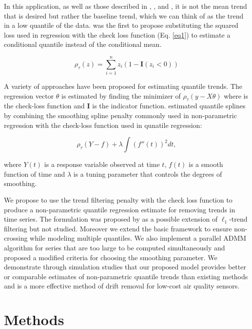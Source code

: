 \documentclass[12pt]{article}
\begin{document}
	
	In this application, as well as those described in \cite{Ning2014}, \cite{marandi2015qualitative}, and \cite{pettersson2013algorithm}, it is not the mean trend that is desired but rather the baseline trend, which we can think of as the trend in a low quantile of the data.  \cite{Koenker1978} was the first to propose substituting the squared loss used in regression with the check loss function  (Eq. \ref{eq1}) to estimate a conditional quantile instead of the conditional mean. 
	
	\begin{equation}
	\label{eq1}
	 \rho_{\tau}(z) = \sum_{i=1}^n z_i(1-\mathbf{I}(z_i<0))
	\end{equation}
	
	A variety of approaches have been proposed for estimating quantile trends.  The regression vector $\theta$ is estimated by finding the minimizer of $\rho_{\tau}(y-X\theta)$ where is the check-loss function and $\mathbf{I}$ is the indicator function.   \cite{nychka1995nonparametric} estimated quantile splines by combining the smoothing spline penalty commonly used in non-parametric regression with the check-loss function used in qunatile regression:
	
	\begin{equation*}
	\rho_{\tau}(Y - f) + \lambda\int (f''(t))^2 dt, 
 	\end{equation*}
	
	where $Y(t)$ is a response variable observed at time $t$, $f(t)$ is a smooth function of time and $\lambda$ is a tuning parameter that controls the degrees of smoothing. 


	We propose to use the trend filtering penalty with the check loss function to produce a non-parametric quantile regression estimate for removing trends in time series. The formulation was proposed by \cite{Kim2009} as a possible extension of $\ell_1$-trend filtering but not studied. Moreover we extend the basic framework to ensure non-crossing while modeling multiple quantiles. We also implement a parallel ADMM algorithm for series that are too large to be computed simultaneously and proposed a modified criteria for choosing the smoothing parameter. We demonstrate through simulation studies that our proposed model provides better or comparable estimates of non-parametric quantile trends than existing methods and is a more effective method of drift removal for low-cost air quality sensors. 
	

	\section{Methods}
	
\end{document}
